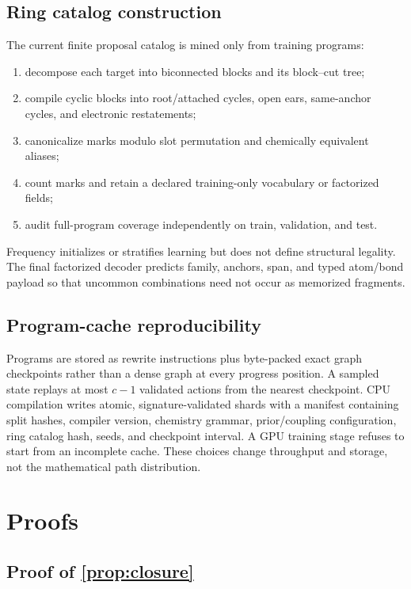 \documentclass{article}
\theoremstyle{definition}
\theoremstyle{remark}
\begin{document}
\subsection{Ring catalog construction}\label{app:ring-catalog}

The current finite proposal catalog is mined only from training programs:
\begin{enumerate}[leftmargin=*]
    \item decompose each target into biconnected blocks and its block--cut tree;
    \item compile cyclic blocks into root/attached cycles, open ears, same-anchor cycles, and electronic restatements;
    \item canonicalize marks modulo slot permutation and chemically equivalent aliases;
    \item count marks and retain a declared training-only vocabulary or factorized fields;
    \item audit full-program coverage independently on train, validation, and test.
\end{enumerate}
Frequency initializes or stratifies learning but does not define structural legality. The final factorized decoder predicts family, anchors, span, and typed atom/bond payload so that uncommon combinations need not occur as memorized fragments.

\subsection{Program-cache reproducibility}

Programs are stored as rewrite instructions plus byte-packed exact graph checkpoints rather than a dense graph at every progress position. A sampled state replays at most $c-1$ validated actions from the nearest checkpoint. CPU compilation writes atomic, signature-validated shards with a manifest containing split hashes, compiler version, chemistry grammar, prior/coupling configuration, ring catalog hash, seeds, and checkpoint interval. A GPU training stage refuses to start from an incomplete cache. These choices change throughput and storage, not the mathematical path distribution.

\section{Proofs}\label{app:proofs}

\subsection{Proof of \cref{prop:closure}}
\end{document}
